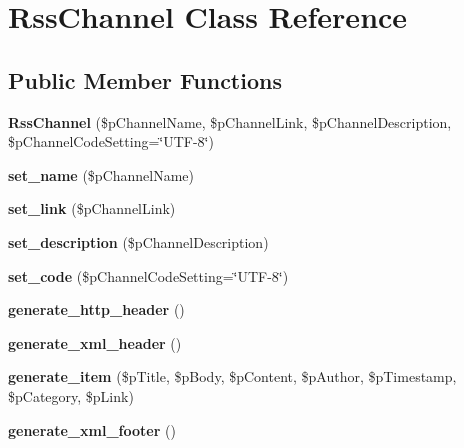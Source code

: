 \hypertarget{class_rss_channel}{
\section{RssChannel Class Reference}
\label{class_rss_channel}
}
\subsection*{Public Member Functions}
\begin{DoxyCompactItemize}
\item 
\hypertarget{class_rss_channel_a305f111c6b7b0655a60a5051cd4e097d}{
{\bfseries RssChannel} (\$pChannelName, \$pChannelLink, \$pChannelDescription, \$pChannelCodeSetting=\char`\"{}UTF-\/8\char`\"{})}
\label{class_rss_channel_a305f111c6b7b0655a60a5051cd4e097d}

\item 
\hypertarget{class_rss_channel_a6b3ebbb523d69c05a6520ad1e95ca566}{
{\bfseries set\_\-name} (\$pChannelName)}
\label{class_rss_channel_a6b3ebbb523d69c05a6520ad1e95ca566}

\item 
\hypertarget{class_rss_channel_abaf3c1320f4064bfdcab42039dd467f6}{
{\bfseries set\_\-link} (\$pChannelLink)}
\label{class_rss_channel_abaf3c1320f4064bfdcab42039dd467f6}

\item 
\hypertarget{class_rss_channel_a455c679af36756721d0ea99f29bb424b}{
{\bfseries set\_\-description} (\$pChannelDescription)}
\label{class_rss_channel_a455c679af36756721d0ea99f29bb424b}

\item 
\hypertarget{class_rss_channel_a98d001d3fe766ba308701c570fabe450}{
{\bfseries set\_\-code} (\$pChannelCodeSetting=\char`\"{}UTF-\/8\char`\"{})}
\label{class_rss_channel_a98d001d3fe766ba308701c570fabe450}

\item 
\hypertarget{class_rss_channel_abf09a68c13808a79febda22ee27da115}{
{\bfseries generate\_\-http\_\-header} ()}
\label{class_rss_channel_abf09a68c13808a79febda22ee27da115}

\item 
\hypertarget{class_rss_channel_a56c932797c327370e4017440840c02bd}{
{\bfseries generate\_\-xml\_\-header} ()}
\label{class_rss_channel_a56c932797c327370e4017440840c02bd}

\item 
\hypertarget{class_rss_channel_a4644f98be16492efbaf6ddec36b09155}{
{\bfseries generate\_\-item} (\$pTitle, \$pBody, \$pContent, \$pAuthor, \$pTimestamp, \$pCategory, \$pLink)}
\label{class_rss_channel_a4644f98be16492efbaf6ddec36b09155}

\item 
\hypertarget{class_rss_channel_a163c73fda970d8e15ba756fc6416575f}{
{\bfseries generate\_\-xml\_\-footer} ()}
\label{class_rss_channel_a163c73fda970d8e15ba756fc6416575f}

\end{DoxyCompactItemize}
